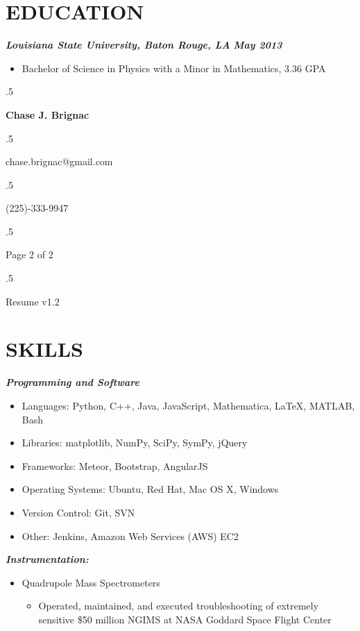 \documentclass{res}
\begin{document}
\begin{resume}
\section{EDUCATION}
	{\bfseries {\em  Louisiana State University, Baton Rouge, LA}} \hfill   {\bfseries {\em May 2013}}\
                \begin{itemize}  \itemsep -14pt
                \item Bachelor of Science in Physics with a Minor in Mathematics, 3.36 GPA\\
                \end{itemize}


\newpage

 \moveleft.5\hoffset\centerline{\large\bf Chase J. Brignac}
\moveleft.5\hoffset\centerline{chase.brignac@gmail.com}
\moveleft.5\hoffset\centerline{(225)-333-9947}
\moveleft.5\hoffset\centerline{Page 2 of 2}
\moveleft.5\hoffset\centerline{Resume v1.2}


\section{SKILLS}
	{\bfseries {\em Programming and Software}}
 		\begin{itemize} 
		\item Languages: Python, C++, Java, JavaScript, Mathematica, \LaTeX{}, MATLAB, Bash
		\item Libraries: matplotlib, NumPy, SciPy, SymPy, jQuery
		\item Frameworks: Meteor, Bootstrap, AngularJS
		\item Operating Systems: Ubuntu, Red Hat, Mac OS X, Windows
		\item Version Control: Git, SVN
		\item Other: Jenkins, Amazon Web Services (AWS) EC2
		\end{itemize}
	 {\bfseries {\em Instrumentation:}}
	 	\begin{itemize}
	 	\item Quadrupole Mass Spectrometers
	 	\begin{itemize}
	 	\item Operated, maintained, and executed troubleshooting of extremely sensitive \$50 million NGIMS at NASA Goddard Space Flight Center
	 	\end{itemize}


\end{itemize}
\end{resume}
\end{document}
